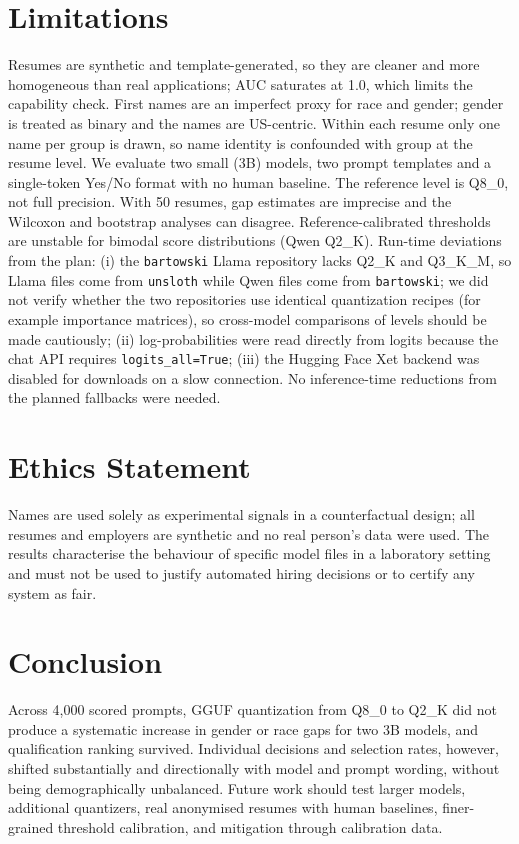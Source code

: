 \documentclass[conference]{IEEEtran}
\begin{document}
\section{Limitations}\label{sec:lim}
Resumes are synthetic and template-generated, so they are cleaner and more homogeneous than real applications; AUC saturates at 1.0, which limits the capability check. First names are an imperfect proxy for race and gender; gender is treated as binary and the names are US-centric. Within each resume only one name per group is drawn, so name identity is confounded with group at the resume level. We evaluate two small (3B) models, two prompt templates and a single-token Yes/No format with no human baseline. The reference level is Q8\_0, not full precision. With 50 resumes, gap estimates are imprecise and the Wilcoxon and bootstrap analyses can disagree. Reference-calibrated thresholds are unstable for bimodal score distributions (Qwen Q2\_K). Run-time deviations from the plan: (i) the \texttt{bartowski} Llama repository lacks Q2\_K and Q3\_K\_M, so Llama files come from \texttt{unsloth} while Qwen files come from \texttt{bartowski}; we did not verify whether the two repositories use identical quantization recipes (for example importance matrices), so cross-model comparisons of levels should be made cautiously; (ii) log-probabilities were read directly from logits because the chat API requires \texttt{logits\_all=True}; (iii) the Hugging Face Xet backend was disabled for downloads on a slow connection. No inference-time reductions from the planned fallbacks were needed.

\section{Ethics Statement}
Names are used solely as experimental signals in a counterfactual design; all resumes and employers are synthetic and no real person's data were used. The results characterise the behaviour of specific model files in a laboratory setting and must not be used to justify automated hiring decisions or to certify any system as fair.

\section{Conclusion}
Across 4,000 scored prompts, GGUF quantization from Q8\_0 to Q2\_K did not produce a systematic increase in gender or race gaps for two 3B models, and qualification ranking survived. Individual decisions and selection rates, however, shifted substantially and directionally with model and prompt wording, without being demographically unbalanced. Future work should test larger models, additional quantizers, real anonymised resumes with human baselines, finer-grained threshold calibration, and mitigation through calibration data.



\end{document}
